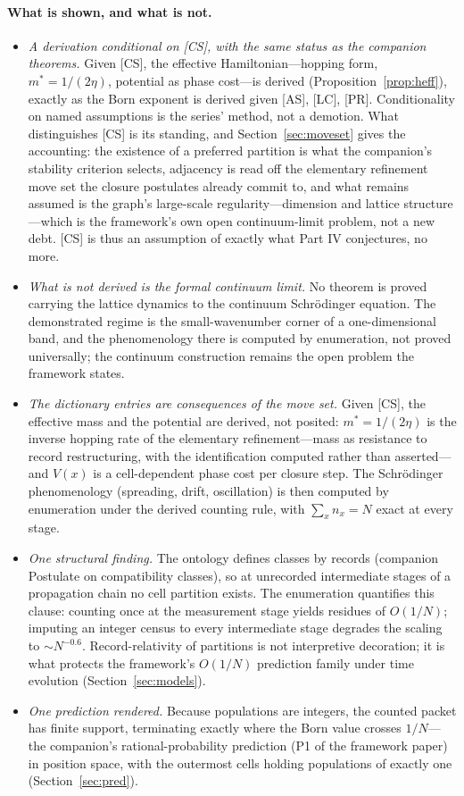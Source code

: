 \documentclass[11pt]{article}
\theoremstyle{definition}
\theoremstyle{remark}
\begin{document}
\paragraph{What is shown, and what is not.}
\begin{itemize}
\item \emph{A derivation conditional on [CS], with the same status as the companion theorems.} Given [CS], the effective Hamiltonian---hopping form, $m^\ast = 1/(2\eta)$, potential as phase cost---is derived (Proposition~\ref{prop:heff}), exactly as the Born exponent is derived given [AS], [LC], [PR]. Conditionality on named assumptions is the series' method, not a demotion. What distinguishes [CS] is its standing, and Section~\ref{sec:moveset} gives the accounting: the existence of a preferred partition is what the companion's stability criterion selects, adjacency is read off the elementary refinement move set the closure postulates already commit to, and what remains assumed is the graph's large-scale regularity---dimension and lattice structure---which is the framework's own open continuum-limit problem, not a new debt. [CS] is thus an assumption of exactly what Part IV conjectures, no more.
\item \emph{What is not derived is the formal continuum limit.} No theorem is proved carrying the lattice dynamics to the continuum Schr\"odinger equation. The demonstrated regime is the small-wavenumber corner of a one-dimensional band, and the phenomenology there is computed by enumeration, not proved universally; the continuum construction remains the open problem the framework states.
\item \emph{The dictionary entries are consequences of the move set.} Given [CS], the effective mass and the potential are derived, not posited: $m^\ast = 1/(2\eta)$ is the inverse hopping rate of the elementary refinement---mass as resistance to record restructuring, with the identification computed rather than asserted---and $V(x)$ is a cell-dependent phase cost per closure step. The Schr\"odinger phenomenology (spreading, drift, oscillation) is then computed by enumeration under the derived counting rule, with $\sum_x n_x = N$ exact at every stage.
\item \emph{One structural finding.} The ontology defines classes by records (companion Postulate on compatibility classes), so at unrecorded intermediate stages of a propagation chain no cell partition exists. The enumeration quantifies this clause: counting once at the measurement stage yields residues of $O(1/N)$; imputing an integer census to every intermediate stage degrades the scaling to $\sim N^{-0.6}$. Record-relativity of partitions is not interpretive decoration; it is what protects the framework's $O(1/N)$ prediction family under time evolution (Section~\ref{sec:models}).
\item \emph{One prediction rendered.} Because populations are integers, the counted packet has finite support, terminating exactly where the Born value crosses $1/N$---the companion's rational-probability prediction (P1 of the framework paper) in position space, with the outermost cells holding populations of exactly one (Section~\ref{sec:pred}).
\end{itemize}
\end{document}
